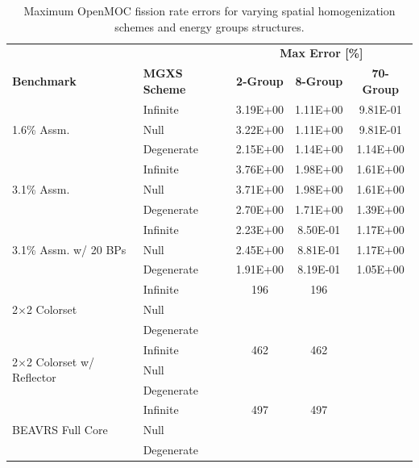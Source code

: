 \begin{table}[h!]
  \centering
  \caption[Maximum OpenMOC fission rate errors]{Maximum OpenMOC fission rate errors for varying spatial homogenization schemes and energy groups structures.}
  \small
  \label{table:chap8-openmoc-max-fiss-rates}
  \vspace{6pt}
  \begin{tabular}{l l c c c}
  \toprule
  \rowcolor{lightgray}
  & & \multicolumn{3}{c}{\cellcolor{lightgray} \textbf{Max Error [\%]}} \\
  \multirow{-2}{*}{\cellcolor{lightgray} \bf Benchmark} &
  \multirow{-2}{*}{\cellcolor{lightgray} \bf \ac{MGXS} Scheme} &
  {\cellcolor{lightgray} \bf 2-Group} &
  {\cellcolor{lightgray} \bf 8-Group} &
  {\cellcolor{lightgray} \bf 70-Group} \\
  \midrule
\multirow{3}{*}{\parbox{2.5cm}{1.6\% Assm.}} & Infinite & 3.19E+00 & 1.11E+00 & 9.81E-01 \\
& Null & 3.22E+00 & 1.11E+00 & 9.81E-01 \\
& Degenerate & 2.15E+00 & 1.14E+00 & 1.14E+00 \\
  \midrule
\multirow{3}{*}{\parbox{2.5cm}{3.1\% Assm.}} & Infinite & 3.76E+00 & 1.98E+00 & 1.61E+00 \\
& Null & 3.71E+00 & 1.98E+00 & 1.61E+00 \\
& Degenerate & 2.70E+00 & 1.71E+00 & 1.39E+00 \\
  \midrule
  \multirow{3}{*}{\parbox{2cm}{3.1\% Assm. w/ 20 BPs}} & Infinite & 2.23E+00 & 8.50E-01 & 1.17E+00 \\
& Null & 2.45E+00 & 8.81E-01 & 1.17E+00 \\
& Degenerate & 1.91E+00 & 8.19E-01 & 1.05E+00 \\
  \midrule
  \multirow{3}{*}{\parbox{2.5cm}{2$\times$2 Colorset}} & Infinite & 196 & 196 & \\
  & Null & & & \\
  & Degenerate & & & \\
  \midrule
  \multirow{3}{*}{\parbox{2.3cm}{2$\times$2 Colorset w/ Reflector}} & Infinite & 462 & 462 & \\
  & Null & & & \\
  & Degenerate & & & \\
  \midrule
  \multirow{3}{*}{\parbox{2cm}{\ac{BEAVRS} Full Core}} & Infinite & 497 & 497 & \\
  & Null & & & \\
  & Degenerate & & & \\
  \bottomrule
\end{tabular}
\end{table}

